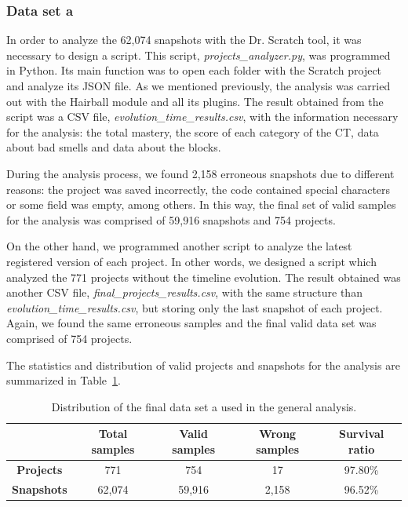 \subsubsection{Data set a}
\label{subsubsec:datacollection_a}

In order to analyze the 62,074 snapshots with the Dr. Scratch tool, it was necessary to design a script. This script, \textit{projects\_analyzer.py}, was programmed in Python. Its main function was to open each folder with the Scratch project and analyze its JSON file. As we mentioned previously, the analysis was carried out with the Hairball module and all its plugins. The result obtained from the script was a CSV file, \textit{evolution\_time\_results.csv}, with the information necessary for the analysis: the total mastery, the score of each category of the CT, data about bad smells and data about the blocks.

During the analysis process, we found 2,158 erroneous snapshots due to different reasons: the project was saved incorrectly, the code contained special characters or some field was empty, among others. In this way, the final set of valid samples for the analysis was comprised of 59,916 snapshots and 754 projects.

On the other hand, we programmed another script to analyze the latest registered version of each project. In other words, we designed a script which analyzed the 771 projects without the timeline evolution. The result obtained was another CSV file, \textit{final\_projects\_results.csv}, with the same structure than \textit{evolution\_time\_results.csv}, but storing only the last snapshot of each project. Again, we found the same erroneous samples and the final valid data set was comprised of 754 projects.

The statistics and distribution of valid projects and snapshots for the analysis are summarized in Table~\ref{table:datacollection_a}.

\begin{table}
 \begin{center}
  \begin{tabular}{|c|c|c|c|c|}
    \hline
     & \textbf{Total samples} & \textbf{Valid samples} & \textbf{Wrong samples} & \textbf{Survival ratio} \\ \hline
    \textbf{Projects} & 771 & 754 & 17 & 97.80\% \\ \hline
    \textbf{Snapshots}& 62,074 & 59,916 & 2,158 & 96.52\% \\ \hline
  \end{tabular}
  \caption{Distribution of the final data set a used in the general analysis.}
  \label{table:datacollection_a}
 \end{center}
\end{table}


